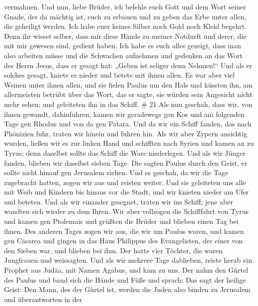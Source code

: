 vermahnen.  Und nun, liebe Brüder, ich befehle euch Gott
und dem Wort seiner Gnade, der da mächtig ist, euch zu erbauen und zu
geben das Erbe unter allen, die geheiligt werden.  Ich habe
euer keines Silber noch Gold noch Kleid begehrt.  Denn ihr
wisset selber, dass mir diese Hände zu meiner Notdurft und derer, die
mit mir gewesen sind, gedient haben.  Ich habe es euch
alles gezeigt, dass man also arbeiten müsse und die Schwachen aufnehmen
und gedenken an das Wort des Herrn Jesus, dass er gesagt hat: „Geben ist
seliger denn Nehmen!{}``  Und als er solches gesagt, kniete
er nieder und betete mit ihnen allen.  Es war aber viel
Weinen unter ihnen allen, und sie fielen Paulus um den Hals und küssten
ihn,  am allermeisten betrübt über das Wort, das er sagte,
sie würden sein Angesicht nicht mehr sehen; und geleiteten ihn in das
Schiff. \# 21  Als nun geschah, dass wir, von ihnen gewandt,
dahinfuhren, kamen wir geradewegs gen Kos und am folgenden Tage gen
Rhodus und von da gen Patara.  Und da wir ein Schiff fanden,
das nach Phönizien fuhr, traten wir hinein und fuhren hin. 
Als wir aber Zypern ansichtig wurden, ließen wir es zur linken Hand und
schifften nach Syrien und kamen an zu Tyrus; denn daselbst sollte das
Schiff die Ware niederlegen.  Und als wir Jünger fanden,
blieben wir daselbst sieben Tage. Die sagten Paulus durch den Geist, er
sollte nicht hinauf gen Jerusalem ziehen.  Und es geschah,
da wir die Tage zugebracht hatten, zogen wir aus und reisten weiter. Und
sie geleiteten uns alle mit Weib und Kindern bis hinaus vor die Stadt,
und wir knieten nieder am Ufer und beteten.  Und als wir
einander gesegnet, traten wir ins Schiff; jene aber wandten sich wieder
zu dem Ihren.  Wir aber vollzogen die Schifffahrt von Tyrus
und kamen gen Ptolemais und grüßten die Brüder und blieben einen Tag bei
ihnen.  Des anderen Tages zogen wir aus, die wir um Paulus
waren, und kamen gen Cäsarea und gingen in das Haus Philippus des
Evangelisten, der einer von den Sieben war, und blieben bei ihm.
 Der hatte vier Töchter, die waren Jungfrauen und
weissagten.  Und als wir mehrere Tage dablieben, reiste
herab ein Prophet aus Judäa, mit Namen Agabus, und kam zu uns.
 Der nahm den Gürtel des Paulus und band sich die Hände und
Füße und sprach: Das sagt der heilige Geist: Den Mann, des der Gürtel
ist, werden die Juden also binden zu Jerusalem und überantworten in der
